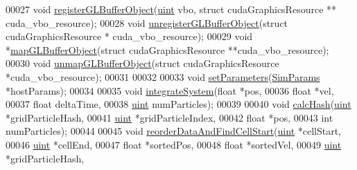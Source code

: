 \begin{DoxyCode}
00027     \textcolor{keywordtype}{void} \hyperlink{particle_system_8cuh_a4386a84282ceeaba09939817aa2a9c24}{registerGLBufferObject}(\hyperlink{particles__kernel_8cuh_a91ad9478d81a7aaf2593e8d9c3d06a14}{uint} vbo, \textcolor{keyword}{struct} cudaGraphicsResource **
      cuda\_vbo\_resource);
00028     \textcolor{keywordtype}{void} \hyperlink{particle_system_8cuh_a9afef8c00ca779aae2d7484b45bce34c}{unregisterGLBufferObject}(\textcolor{keyword}{struct} cudaGraphicsResource *
      cuda\_vbo\_resource);
00029     \textcolor{keywordtype}{void} *\hyperlink{particle_system_8cuh_aa491077afd740a269815eb9ce81c8642}{mapGLBufferObject}(\textcolor{keyword}{struct} cudaGraphicsResource **cuda\_vbo\_resource);
00030     \textcolor{keywordtype}{void} \hyperlink{particle_system_8cuh_a98c3325419b7528d34a51ca7972d7095}{unmapGLBufferObject}(\textcolor{keyword}{struct} cudaGraphicsResource *cuda\_vbo\_resource);
00031 
00032 
00033     \textcolor{keywordtype}{void} \hyperlink{particle_system_8cuh_a342176dbaba2668312c45e1a1423fc4e}{setParameters}(\hyperlink{struct_sim_params}{SimParams} *hostParams);
00034 
00035     \textcolor{keywordtype}{void} \hyperlink{particle_system_8cuh_a34e9db8b801cd537e5ae5a4a886e020c}{integrateSystem}(\textcolor{keywordtype}{float} *pos,
00036                          \textcolor{keywordtype}{float} *vel,
00037                          \textcolor{keywordtype}{float} deltaTime,
00038                          \hyperlink{particles__kernel_8cuh_a91ad9478d81a7aaf2593e8d9c3d06a14}{uint} numParticles);
00039 
00040     \textcolor{keywordtype}{void} \hyperlink{particle_system_8cuh_ae0a4037d25e768622443077546399cf2}{calcHash}(\hyperlink{particles__kernel_8cuh_a91ad9478d81a7aaf2593e8d9c3d06a14}{uint}  *gridParticleHash,
00041                   \hyperlink{particles__kernel_8cuh_a91ad9478d81a7aaf2593e8d9c3d06a14}{uint}  *gridParticleIndex,
00042                   \textcolor{keywordtype}{float} *pos,
00043                   \textcolor{keywordtype}{int}    numParticles);
00044 
00045     \textcolor{keywordtype}{void} \hyperlink{particle_system_8cuh_ac72ccd068434c46c2f901c751d53be1d}{reorderDataAndFindCellStart}(\hyperlink{particles__kernel_8cuh_a91ad9478d81a7aaf2593e8d9c3d06a14}{uint}  *cellStart,
00046                                      \hyperlink{particles__kernel_8cuh_a91ad9478d81a7aaf2593e8d9c3d06a14}{uint}  *cellEnd,
00047                                      \textcolor{keywordtype}{float} *sortedPos,
00048                                      \textcolor{keywordtype}{float} *sortedVel,
00049                                      \hyperlink{particles__kernel_8cuh_a91ad9478d81a7aaf2593e8d9c3d06a14}{uint}  *gridParticleHash,

\end{DoxyCode}

